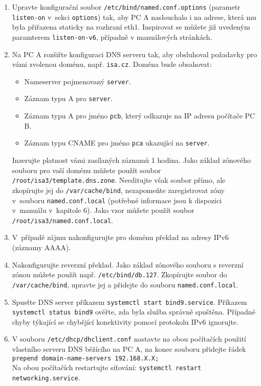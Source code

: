 \begin{enumerate}
  \item Upravte konfigurační soubor {\tt /etc/bind/named.conf.options} (parametr
    {\tt listen-on} v~sekci {\tt options}) tak, aby
    PC A naslouchalo i na adrese, která mu byla přiřazena staticky na rozhraní eth1.
    Inspirovat se můžete již uvedeným paramterem {\tt listen-on-v6}, případně v
    manuálových stránkách.
  \item Na PC A rozšiřte konfiguraci DNS serveru tak, aby obsluhoval požadavky pro vámi
    zvolenou doménu, např. {\tt isa.cz}. Doména bude obsahovat:
    \begin{itemize}
      \item Nameserver pojmenovaný {\tt server}.
      \item Záznam typu A pro {\tt server}.
      \item Záznam typu A pro jméno {\tt pcb}, který odkazuje na IP adresu
        počítače PC B.
      \item Záznam typu CNAME pro jméno {\tt pca} ukazující na {\tt server}.
    \end{itemize}
    Inzerujte platnost vámi zasílaných záznamů 1 hodina.
    Jako základ zónového souboru pro vaší doménu můžete použít soubor {\tt /root/isa3/template.dns.zone}.
    Needitujte však soubor přímo, ale zkopírujte jej do {\tt /var/cache/bind},
    nezapomeňte zaregistrovat zóny v~souboru {\tt named.conf.local} 
    (potřebné informace jsou k dispozici v~manuálu v~kapitole 6). Jako vzor můžete použít soubor
    {\tt /root/isa3/named.conf.local}.
  \item V~případě zájmu nakonfigurujte pro doménu překlad na adresy IPv6
    (záznamy AAAA).
  \item Nakonfigurujte reverzní překlad. Jako základ
    zónového souboru s reverzní zónou můžete použít např. {\tt /etc/bind/db.127}.
    Zkopírujte soubor do {\tt /var/cache/bind}, upravte jej a přidejte do
    souboru {\tt named.conf.local}.
  \item Spusťte DNS server příkazem {\tt systemctl start bind9.service}.
    Příkazem {\tt systemctl status bind9} ověřte, zda byla služba správně spuštěna.
    Případné chyby týkající se chybějící konektivity pomocí protokolu IPv6 ignorujte.
  \item V souboru {\tt /etc/dhcp/dhclient.conf} nastavte na obou počítačích použití vlastního
    serveru DNS běžícího na PC A, na konec souboru přidejte řádek \\
    {\tt prepend domain-name-servers
    192.168.X.X;} \\ Na obou počítačích restartujte síťování: {\tt systemctl restart networking.service}.

\end{enumerate}
